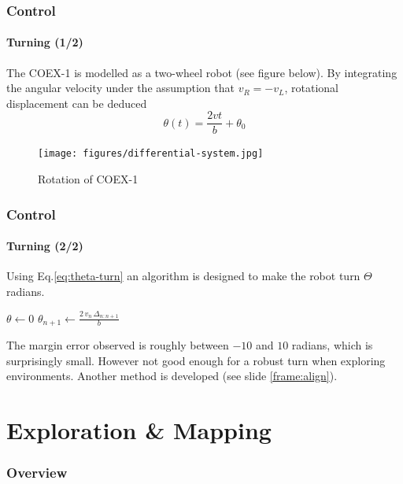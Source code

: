 \documentclass[10pt]{beamer}
\begin{document}

\begin{frame}[label={frame:control-turn}]
\frametitle{Control}
\framesubtitle{Turning (1/2)}
The COEX-1 is modelled as a two-wheel robot (see figure below). By integrating the angular velocity under the assumption that $v_R = -v_L$, rotational displacement can be deduced
\begin{equation}\label{eq:theta-turn}
\theta(t) = \frac{2vt}{b} + \theta_0
\end{equation}
\begin{figure}[hbtp]
\centering
\texttt{[image: figures/differential-system.jpg]}
\caption{Rotation of COEX-1}
\label{fig:model-turn}
\end{figure}
\end{frame}


\begin{frame}
\frametitle{Control}
\framesubtitle{Turning (2/2)}
Using Eq.\ref{eq:theta-turn} an algorithm is designed to make the robot turn $\Theta$ radians.
\vspace*{8mm}
\begin{algorithmic}[1]
\State $\theta\gets 0$
\State {}
\While{$\theta < \Theta$}
\State $\theta_{n+1} \gets \frac{2\, v_n\, \Delta_{n:n+1}}{b}$
\EndWhile
\State {}
\EndProcedure
\end{algorithmic}
\vspace*{8mm}
The margin error observed is roughly between $-10$ and $10$ radians, which is surprisingly small. However not good enough for a robust turn when exploring environments. Another method is developed (see slide \ref{frame:align}).
\end{frame}


\section{Exploration \& Mapping} 

\begin{frame}
\frametitle{Overview}
\tableofcontents[currentsection,subsectionstyle=shaded]
\end{frame}
\end{document}

